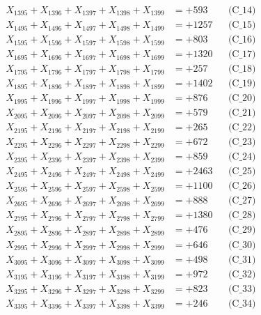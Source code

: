 \documentclass[a4paper,10pt]{article}
\begin{document}
{\begin{align}
X_{1395} + X_{1396} + X_{1397} + X_{1398} + X_{1399} &= +593 && \text{(C\_14)} \\
X_{1495} + X_{1496} + X_{1497} + X_{1498} + X_{1499} &= +1257 && \text{(C\_15)} \\
\allowbreak
X_{1595} + X_{1596} + X_{1597} + X_{1598} + X_{1599} &= +803 && \text{(C\_16)} \\
X_{1695} + X_{1696} + X_{1697} + X_{1698} + X_{1699} &= +1320 && \text{(C\_17)} \\
X_{1795} + X_{1796} + X_{1797} + X_{1798} + X_{1799} &= +257 && \text{(C\_18)} \\
X_{1895} + X_{1896} + X_{1897} + X_{1898} + X_{1899} &= +1402 && \text{(C\_19)} \\
X_{1995} + X_{1996} + X_{1997} + X_{1998} + X_{1999} &= +876 && \text{(C\_20)} \\
\allowbreak
X_{2095} + X_{2096} + X_{2097} + X_{2098} + X_{2099} &= +579 && \text{(C\_21)} \\
X_{2195} + X_{2196} + X_{2197} + X_{2198} + X_{2199} &= +265 && \text{(C\_22)} \\
X_{2295} + X_{2296} + X_{2297} + X_{2298} + X_{2299} &= +672 && \text{(C\_23)} \\
X_{2395} + X_{2396} + X_{2397} + X_{2398} + X_{2399} &= +859 && \text{(C\_24)} \\
X_{2495} + X_{2496} + X_{2497} + X_{2498} + X_{2499} &= +2463 && \text{(C\_25)} \\
\allowbreak
X_{2595} + X_{2596} + X_{2597} + X_{2598} + X_{2599} &= +1100 && \text{(C\_26)} \\
X_{2695} + X_{2696} + X_{2697} + X_{2698} + X_{2699} &= +888 && \text{(C\_27)} \\
X_{2795} + X_{2796} + X_{2797} + X_{2798} + X_{2799} &= +1380 && \text{(C\_28)} \\
X_{2895} + X_{2896} + X_{2897} + X_{2898} + X_{2899} &= +476 && \text{(C\_29)} \\
X_{2995} + X_{2996} + X_{2997} + X_{2998} + X_{2999} &= +646 && \text{(C\_30)} \\
\allowbreak
X_{3095} + X_{3096} + X_{3097} + X_{3098} + X_{3099} &= +498 && \text{(C\_31)} \\
X_{3195} + X_{3196} + X_{3197} + X_{3198} + X_{3199} &= +972 && \text{(C\_32)} \\
X_{3295} + X_{3296} + X_{3297} + X_{3298} + X_{3299} &= +823 && \text{(C\_33)} \\
X_{3395} + X_{3396} + X_{3397} + X_{3398} + X_{3399} &= +246 && \text{(C\_34)} \\

\end{align}}
\end{document}
